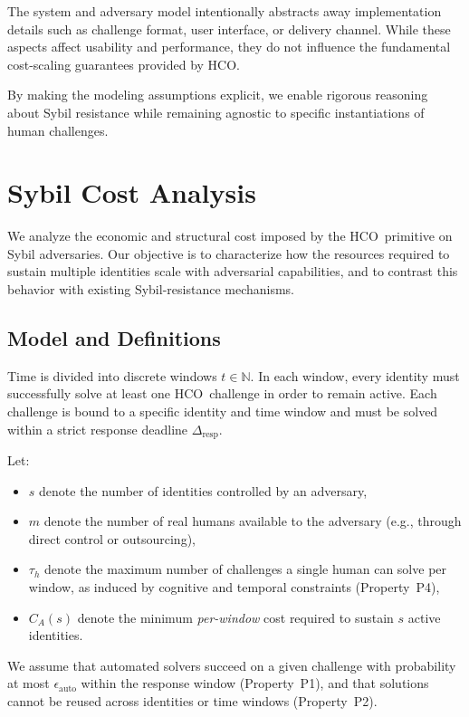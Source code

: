 \documentclass[11pt]{article}
\newcommand{\HCO}{HCO\xspace}
\begin{document}
The system and adversary model intentionally abstracts away implementation details such as challenge format, user interface, or delivery channel. While these aspects affect usability and performance, they do not influence the fundamental cost-scaling guarantees provided by \HCO.

By making the modeling assumptions explicit, we enable rigorous reasoning about Sybil resistance while remaining agnostic to specific instantiations of human challenges.

	
\section{Sybil Cost Analysis}
\label{sec:sybil-cost}

We analyze the economic and structural cost imposed by the \HCO\ primitive on Sybil adversaries. Our objective is to characterize how the resources required to sustain multiple identities scale with adversarial capabilities, and to contrast this behavior with existing Sybil-resistance mechanisms.

\subsection{Model and Definitions}

Time is divided into discrete windows $t \in \mathbb{N}$. In each window, every identity must successfully solve at least one \HCO\ challenge in order to remain active. Each challenge is bound to a specific identity and time window and must be solved within a strict response deadline $\Delta_{\mathrm{resp}}$.

Let:
\begin{itemize}
	\item $s$ denote the number of identities controlled by an adversary,
	\item $m$ denote the number of real humans available to the adversary (e.g., through direct control or outsourcing),
	\item $\tau_h$ denote the maximum number of challenges a single human can solve per window, as induced by cognitive and temporal constraints (Property~P4),
	\item $C_A(s)$ denote the minimum \emph{per-window} cost required to sustain $s$ active identities.
\end{itemize}

We assume that automated solvers succeed on a given challenge with probability at most $\epsilon_{\mathrm{auto}}$ within the response window (Property~P1), and that solutions cannot be reused across identities or time windows (Property~P2).
\end{document}
